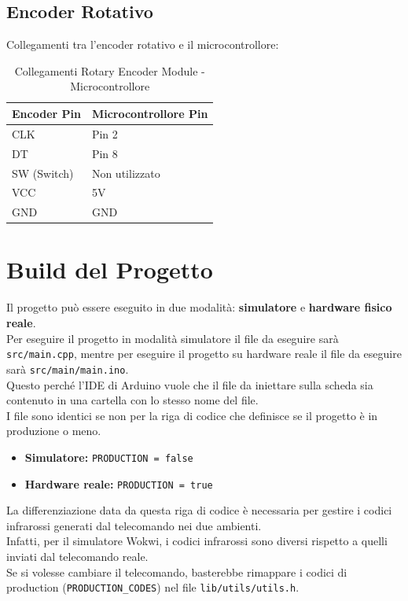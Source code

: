 \documentclass[a4paper, 12pt]{article}
\begin{document}
\subsection{Encoder Rotativo}
\label{subsec:setup-encoder}
Collegamenti tra l'encoder rotativo e il microcontrollore:

\begin{table}[H]
	\centering
	\caption{Collegamenti Rotary Encoder Module - Microcontrollore}
	\label{tab:rotary-encoder-connections}
	\begin{tabular}{ll}
		\toprule
		\textbf{Encoder Pin} & \textbf{Microcontrollore Pin} \\
		\midrule
		CLK                  & Pin 2                         \\
		DT                   & Pin 8                         \\
		SW (Switch)          & Non utilizzato                \\
		VCC                  & 5V                            \\
		GND                  & GND                           \\
		\bottomrule
	\end{tabular}
\end{table}

\section{Build del Progetto}
\label{sec:build}
Il progetto può essere eseguito in due modalità: \textbf{simulatore} e \textbf{hardware fisico reale}.\\
Per eseguire il progetto in modalità simulatore il file da eseguire sarà \texttt{src/main.cpp}, mentre per eseguire il progetto su hardware
reale il file da eseguire sarà \texttt{src/main/main.ino}.\\
Questo perché l'IDE di Arduino vuole che il file da iniettare sulla scheda sia contenuto in una cartella con lo stesso nome del file.\\
I file sono identici se non per la riga di codice che definisce se il progetto è in produzione o meno.
\begin{itemize}
	\item \textbf{Simulatore:} \texttt{PRODUCTION = false}
	\item \textbf{Hardware reale:} \texttt{PRODUCTION = true}
\end{itemize}

La differenziazione data da questa riga di codice è necessaria per gestire i codici infrarossi generati dal telecomando nei due ambienti.\\
Infatti, per il simulatore Wokwi, i codici infrarossi sono diversi rispetto a quelli inviati dal telecomando reale.\\
Se si volesse cambiare il telecomando, basterebbe rimappare i codici di production (\texttt{PRODUCTION\_CODES}) nel file \texttt{lib/utils/utils.h}.
\end{document}
